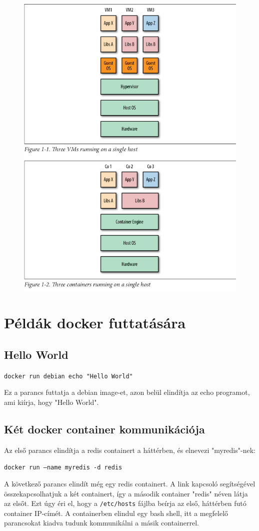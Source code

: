 \documentclass[]{article}
\numberwithin{equation}{section}
\begin{document}
\begin{figure}
	\centering
	\includegraphics[width=0.7\linewidth]{cont_vs_vm}
	\caption{}
	\label{fig:contvsvm}
\end{figure}

\section{Példák docker futtatására}

\subsection{Hello World}

\texttt{docker run debian echo "Hello World"}

Ez a parancs futtatja a debian image-et, azon belül elindítja az echo programot, ami kiírja, hogy "Hello World".

\subsection{Két docker container kommunikációja}

Az első parancs elindítja a redis containert a háttérben, és elnevezi "myredis"-nek:

\texttt{docker run --name myredis -d redis}

A következő parancs elindít még egy redis containert. A link kapcsoló segítségével összekapcsolhatjuk a két containert, így a második container "redis" néven látja az elsőt. Ezt úgy éri el, hogy a \texttt{/etc/hosts} fájlba beírja az első, háttérben futó container IP-címét. A containerben elindul egy bash shell, itt a megfelelő parancsokat kiadva tudunk kommunikálni a másik containerrel.
\end{document}
